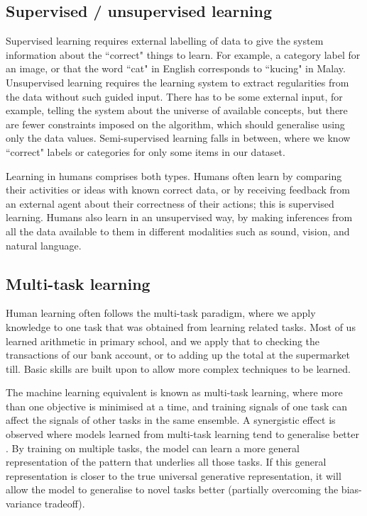 \subsection{Supervised / unsupervised learning}
Supervised learning requires external labelling of data to give the system information about the ``correct" things to learn. For example, a category label for an image, or that the word ``cat" in English corresponds to ``kucing" in Malay. Unsupervised learning requires the learning system to extract regularities from the data without such guided input. There has to be some external input, for example, telling the system about the universe of available concepts, but there are fewer constraints imposed on the algorithm, which should generalise using only the data values. Semi-supervised learning falls in between, where we know ``correct" labels or categories for only some items in our dataset. 

Learning in humans comprises both types. Humans often learn by comparing their activities or ideas with known correct data, or by receiving feedback from an external agent about their correctness of their actions; this is supervised learning. Humans also learn in an unsupervised way, by making inferences from all the data available to them in different modalities such as sound, vision, and natural language. 

\subsection{Multi-task learning}

Human learning often follows the multi-task paradigm, where we apply knowledge to one task that was obtained from learning related tasks. Most of us learned arithmetic in primary school, and we apply that to checking the transactions of our bank account, or to adding up the total at the supermarket till. Basic skills are built upon to allow more complex techniques to be learned. 

The machine learning equivalent is known as multi-task learning, where more than one objective is minimised at a time, and training signals of one task can affect the signals of other tasks in the same ensemble. A synergistic effect is observed where models learned from multi-task learning tend to generalise better \cite{OverviewMultiTaskLearning}. By training on multiple tasks, the model can learn a more general representation of the pattern that underlies all those tasks. If this general representation is closer to the true universal generative representation, it will allow the model to generalise to novel tasks better (partially overcoming the bias-variance tradeoff). %

